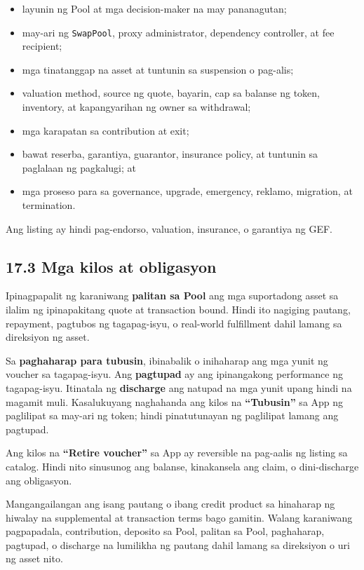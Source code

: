 \documentclass[11pt]{article}
\begin{document}
\begin{itemize}[leftmargin=*]
\item layunin ng Pool at mga decision-maker na may pananagutan;
\item may-ari ng \texttt{SwapPool}, proxy administrator, dependency controller, at fee recipient;
\item mga tinatanggap na asset at tuntunin sa suspension o pag-alis;
\item valuation method, source ng quote, bayarin, cap sa balanse ng token, inventory, at kapangyarihan ng owner sa withdrawal;
\item mga karapatan sa contribution at exit;
\item bawat reserba, garantiya, guarantor, insurance policy, at tuntunin sa paglalaan ng pagkalugi; at
\item mga proseso para sa governance, upgrade, emergency, reklamo, migration, at termination.
\end{itemize}
Ang listing ay hindi pag-endorso, valuation, insurance, o garantiya ng GEF.

\subsection*{17.3 Mga kilos at obligasyon}

Ipinagpapalit ng karaniwang \textbf{palitan sa Pool} ang mga suportadong asset sa ilalim ng ipinapakitang quote at transaction bound. Hindi ito nagiging pautang, repayment, pagtubos ng tagapag-isyu, o real-world fulfillment dahil lamang sa direksiyon ng asset.

Sa \textbf{paghaharap para tubusin}, ibinabalik o inihaharap ang mga yunit ng voucher sa tagapag-isyu. Ang \textbf{pagtupad} ay ang ipinangakong performance ng tagapag-isyu. Itinatala ng \textbf{discharge} ang natupad na mga yunit upang hindi na magamit muli. Kasalukuyang naghahanda ang kilos na \textbf{``Tubusin''} sa App ng paglilipat sa may-ari ng token; hindi pinatutunayan ng paglilipat lamang ang pagtupad.

Ang kilos na \textbf{``Retire voucher''} sa App ay reversible na pag-aalis ng listing sa catalog. Hindi nito sinusunog ang balanse, kinakansela ang claim, o dini-discharge ang obligasyon.

Mangangailangan ang isang pautang o ibang credit product sa hinaharap ng hiwalay na supplemental at transaction terms bago gamitin. Walang karaniwang pagpapadala, contribution, deposito sa Pool, palitan sa Pool, paghaharap, pagtupad, o discharge na lumilikha ng pautang dahil lamang sa direksiyon o uri ng asset nito.
\end{document}
